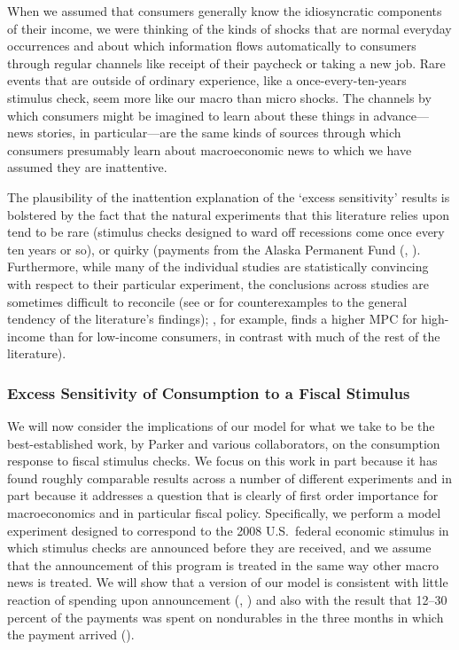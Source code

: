 \documentclass[titlepage]{./econtex}
\begin{document}
When we assumed that consumers generally know the idiosyncratic components of their income, we were thinking of the kinds of shocks that are normal everyday occurrences and about which information flows automatically to consumers through regular channels like receipt of their paycheck or taking a new job.  Rare events that are outside of ordinary experience, like a once-every-ten-years stimulus check, seem more like our macro than micro shocks.  The channels by which consumers might be imagined to learn about these things in advance---news stories, in particular---are the same kinds of sources through which consumers presumably learn about macroeconomic news to which we have assumed they are inattentive. 

The plausibility of the inattention explanation of the `excess sensitivity' results is bolstered by the fact that the natural experiments that this literature relies upon tend to be rare (stimulus checks designed to ward off recessions come once every ten years or so), or quirky (payments from the Alaska Permanent Fund (\cite{hsiehAlaska}, \cite{kuengAlaska}).  Furthermore, while many of the individual studies are statistically convincing with respect to their particular experiment, the conclusions across studies are sometimes difficult to reconcile (see \cite{hsiehAlaska} or \cite{CoulibalyLiMortgage} for counterexamples to the general tendency of the literature's findings); \cite{kuengAlaska}, for example, finds a higher MPC for high-income than for low-income consumers, in contrast with much of the rest of the literature).


\subsubsection{Excess Sensitivity of Consumption to a Fiscal Stimulus}

We will now consider the implications of our model for what we take to be the best-established work, by Parker and various collaborators, on the consumption response to fiscal stimulus checks. We focus on this work in part because it has found roughly comparable results across a number of different experiments and in part because it addresses a question that is clearly of first order importance for macroeconomics and in particular fiscal policy. Specifically, we perform a model experiment designed to correspond to the 2008 U.S.\ federal economic stimulus in which stimulus checks are announced before they are received, and we assume that the announcement of this program is treated in the same way other macro news is treated. We will show that a version of our model is consistent with little reaction of spending upon announcement (\cite{brodaParker}, \cite{parker25million}) and also with the result that 12--30 percent of the payments was spent on nondurables in the three months in which the payment arrived (\cite{psjmMPC2008}).
\end{document}
